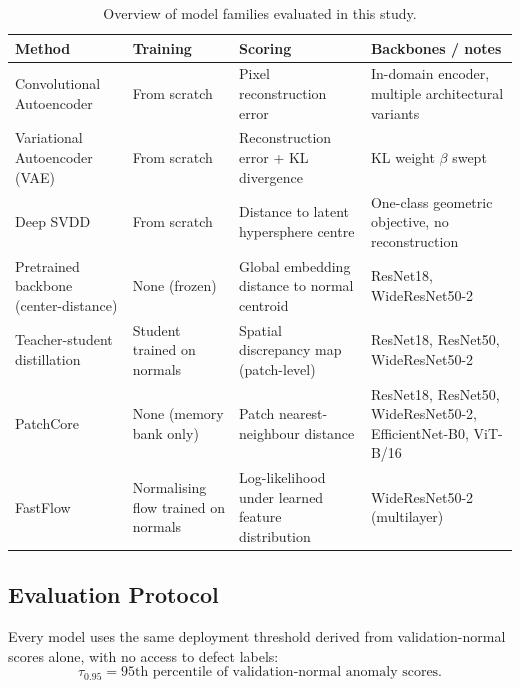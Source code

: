 \documentclass[11pt]{article}
\begin{document}
\begin{table}[H]
\centering
\caption{Overview of model families evaluated in this study.}
\label{tab:method_overview}
\begin{tabularx}{\linewidth}{>{\raggedright\arraybackslash}p{3.2cm}
                              >{\raggedright\arraybackslash}p{2.2cm}
                              >{\raggedright\arraybackslash}p{2.4cm}
                              >{\raggedright\arraybackslash}X}
\toprule
Method & Training & Scoring & Backbones / notes \\
\midrule
Convolutional Autoencoder
  & From scratch
  & Pixel reconstruction error
  & In-domain encoder, multiple architectural variants \\
Variational Autoencoder (VAE)
  & From scratch
  & Reconstruction error + KL divergence
  & KL weight $\beta$ swept \\
Deep SVDD
  & From scratch
  & Distance to latent hypersphere centre
  & One-class geometric objective, no reconstruction \\
\midrule
Pretrained backbone (center-distance)
  & None (frozen)
  & Global embedding distance to normal centroid
  & ResNet18, WideResNet50-2 \\
\midrule
Teacher-student distillation
  & Student trained on normals
  & Spatial discrepancy map (patch-level)
  & ResNet18, ResNet50, WideResNet50-2 \\
PatchCore
  & None (memory bank only)
  & Patch nearest-neighbour distance
  & ResNet18, ResNet50, WideResNet50-2, EfficientNet-B0, ViT-B/16 \\
FastFlow
  & Normalising flow trained on normals
  & Log-likelihood under learned feature distribution
  & WideResNet50-2 (multilayer) \\
\bottomrule
\end{tabularx}
\end{table}

\subsection{Evaluation Protocol}

Every model uses the same deployment threshold derived from validation-normal
scores alone, with no access to defect labels:
\[
  \tau_{0.95} = \text{95th percentile of validation-normal anomaly scores.}
\]
\end{document}

